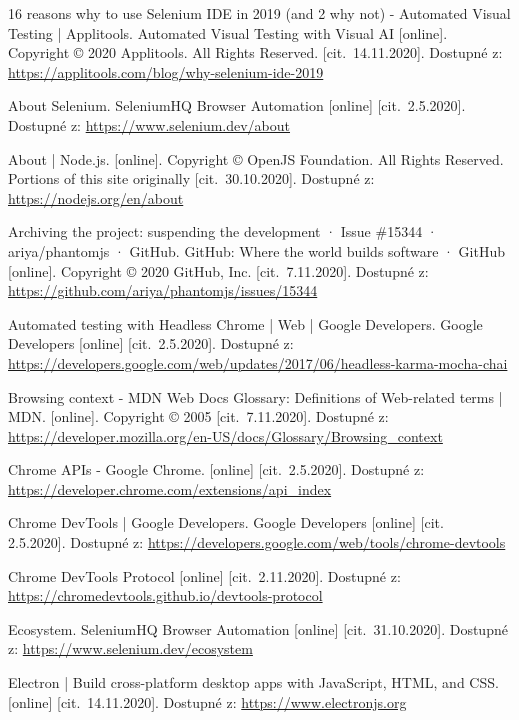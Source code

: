 \newpage
{}
\begin{thebibliography}{99}
 16 reasons why to use Selenium IDE in 2019 (and 2 why not) - Automated Visual Testing | Applitools. Automated Visual Testing with Visual AI [online]. Copyright © 2020 Applitools. All Rights Reserved. [cit.~14.11.2020]. Dostupné z: \url{https://applitools.com/blog/why-selenium-ide-2019}

 About Selenium. SeleniumHQ Browser Automation [online] [cit.~2.5.2020]. Dostupné z: \url{https://www.selenium.dev/about}

 About | Node.js. [online]. Copyright © OpenJS Foundation. All Rights Reserved. Portions of this site originally [cit.~30.10.2020]. Dostupné z: \url{https://nodejs.org/en/about}

 Archiving the project: suspending the development · Issue \#15344 · ariya/phantomjs · GitHub. GitHub: Where the world builds software · GitHub [online]. Copyright © 2020 GitHub, Inc. [cit.~7.11.2020]. Dostupné z: \url{https://github.com/ariya/phantomjs/issues/15344}

 Automated testing with Headless Chrome  |  Web  |  Google Developers. Google Developers [online] [cit.~2.5.2020]. Dostupné z: \url{https://developers.google.com/web/updates/2017/06/headless-karma-mocha-chai}

 Browsing context - MDN Web Docs Glossary: Definitions of Web-related terms | MDN. [online]. Copyright © 2005 [cit.~7.11.2020]. Dostupné z: \url{https://developer.mozilla.org/en-US/docs/Glossary/Browsing_context}

 Chrome APIs - Google Chrome. [online] [cit.~2.5.2020]. Dostupné z: \url{https://developer.chrome.com/extensions/api_index}

 Chrome DevTools  |  Google Developers. Google Developers [online] [cit.~	2.5.2020]. Dostupné z: 	\url{https://developers.google.com/web/tools/chrome-devtools}

 Chrome DevTools Protocol [online] [cit.~2.11.2020]. Dostupné z: \url{https://chromedevtools.github.io/devtools-protocol}

 Ecosystem. SeleniumHQ Browser Automation [online] [cit.~31.10.2020]. Dostupné z: \url{https://www.selenium.dev/ecosystem}

 Electron | Build cross-platform desktop apps with JavaScript, HTML, and CSS. [online] [cit.~14.11.2020]. Dostupné z: \url{https://www.electronjs.org}


\end{thebibliography}
